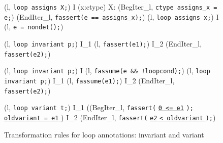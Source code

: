 \begin{figure*}[tb]
  \scriptsize{
  {
    {
      \splitfrac
      {
        (l, \mbox{\lstinline'loop assigns X;'}) 
      }
      {
        I \concat
        \forall (x:ctype) \not \in X:
        (BegIter_l, \mbox{\lstinline'ctype assigns_x = e;'})
        \concat (EndIter_l, \mbox{\lstinline'fassert(e == assigns_x);'})
      }
    }
  }
  {
    {(l, \mbox{\lstinline'loop assigns x;'})
      I \concat (l, \mbox{\lstinline'e = nondet();'})}
  }
  \vspace{-1mm}

 {
    {
      (l, \mbox{\lstinline'loop invariant p;'}) 
      I_1 \concat (l, \mbox{\lstinline'fassert(e1);'})
      \concat I_2 \concat (EndIter_l, \mbox{\lstinline'fassert(e2);'})
    }
  }

 {
    {
      (l, \mbox{\lstinline'loop invariant p;'}) 
      I \concat (l, \mbox{\lstinline'fassume(e && !loopcond);'})
    }
  }
 {
    {
      (l, \mbox{\lstinline'loop invariant p;'}) 
      I_1 \concat (l, \mbox{\lstinline'fassume(e1);'})
      \concat I_2 \concat (EndIter_l, \mbox{\lstinline'fassert(e2);'})
    }
  }
 \vspace{-1mm}

 {
   {
     \splitfrac
         {
           (l, \mbox{\lstinline'loop variant t;'}) 
         }
         {
           I_1 \concat ((BegIter_l,
           \mbox{\lstinline'fassert('}
           \underline{\mbox{\lstinline'0 <= e1'}}
           \mbox{\lstinline');' }
           \underline{\Zinit \mbox{\lstinline'oldvariant = e1'} \Zclear}
           \semicolon)
           \concat I_2
           \concat(EndIter_l,
           \mbox{\lstinline'fassert('}
           \underline{\mbox{\lstinline'e2'}\Zclear
             \mbox{\lstinline'< oldvariant'} \Zclear}
           \mbox{\lstinline');'})
         }
   }
 }
  }
  \caption{Transformation rules for loop annotations: invariant and variant}
  \label{fig:loop-annot}
\end{figure*}
